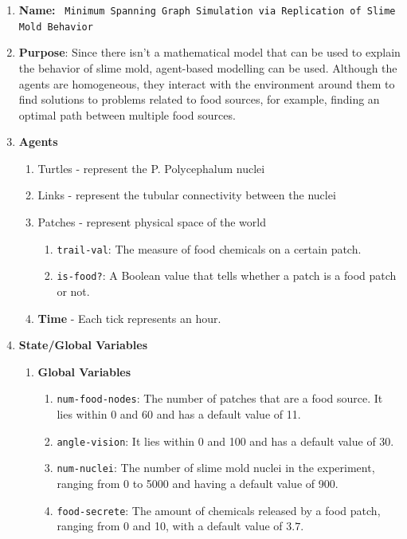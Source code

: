 \documentclass[a4paper, 12pt]{article}
\begin{document}
\begin{enumerate}
    \item \textbf{Name: }\texttt{ Minimum Spanning Graph Simulation via Replication of Slime Mold Behavior}
    \item \textbf{Purpose}: Since there isn't a mathematical model that can be used to explain the behavior of slime mold, agent-based modelling can be used. Although the agents are homogeneous, they interact with the environment around them to find solutions to problems related to food sources, for example, finding an optimal path between multiple food sources.  
    \item \textbf{Agents}\par
    \begin{enumerate}
        \item Turtles - represent the P. Polycephalum nuclei
        \item Links - represent the tubular connectivity between the nuclei
        \item Patches - represent physical space of the world 
            \begin{enumerate}
                \item \texttt{trail-val}: The measure of food chemicals on a certain patch.
                \item \texttt{is-food?}: A Boolean value that tells whether a patch is a food patch or not.
            \end{enumerate}
        \item \textbf{Time} - Each tick represents an hour.
    \end{enumerate}
    \item \textbf{State/Global Variables}
    \begin{enumerate}
        \item \textbf{Global Variables}
        \begin{enumerate}
            \item \texttt{num-food-nodes}: The number of patches that are a food source. It lies within 0 and 60 and has a default value of 11. 
            \item \texttt{angle-vision}: It lies within 0 and 100 and has a default value of 30. 
            \item \texttt{num-nuclei}: The number of slime mold nuclei in the experiment, ranging from 0 to 5000 and having a default value of 900.
            \item \texttt{food-secrete}: The amount of chemicals released by a food patch, ranging from 0 and 10, with a default value of $3.7$.

\end{enumerate}
\end{enumerate}
\end{enumerate}
\end{document}
